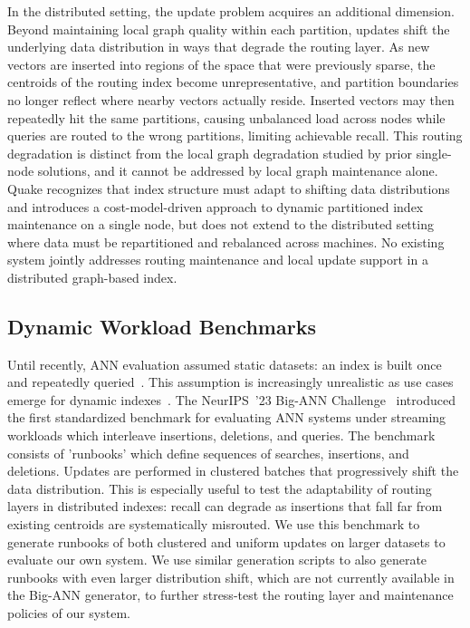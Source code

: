 \documentclass[sigconf,review,anonymous]{acmart}
\begin{document}
    In the distributed setting, the update problem acquires an additional dimension. Beyond maintaining local graph quality within each partition, updates shift the underlying data distribution in ways that degrade the routing layer. As new vectors are inserted into regions of the space that were previously sparse, the centroids of the routing index become unrepresentative, and partition boundaries no longer reflect where nearby vectors actually reside. Inserted vectors may then repeatedly hit the same partitions, causing unbalanced load across nodes while queries are routed to the wrong partitions, limiting achievable recall. This routing degradation is distinct from the local graph degradation studied by prior single-node solutions, and it cannot be addressed by local graph maintenance alone. Quake \cite{mohoney2025quake} recognizes that index structure must adapt to shifting data distributions and introduces a cost-model-driven approach to dynamic partitioned index maintenance on a single node, but does not extend to the distributed setting where data must be repartitioned and rebalanced across machines. No existing system jointly addresses routing maintenance and local update support in a distributed graph-based index.

\subsection{Dynamic Workload Benchmarks}
\label{sec:benchmarks}
    Until recently, ANN evaluation assumed static datasets: an index is built once and repeatedly queried~\cite{simhadri2022results,simhadri2024results,jegou2011searching,yandex2016deep}. This assumption is increasingly unrealistic as use cases emerge for dynamic indexes~\cite{singh2021freshdiskann, xu2023spfresh, mohoney2025quake, manu2022}. The NeurIPS~'23 Big-ANN Challenge~\cite{simhadri2024results} introduced the first standardized benchmark for evaluating ANN systems under streaming workloads which interleave insertions, deletions, and queries. The benchmark consists of 'runbooks' which define sequences of searches, insertions, and deletions. Updates are performed in clustered batches that progressively shift the data distribution. This is especially useful to test the adaptability of routing layers in distributed indexes: recall can degrade as insertions that fall far from existing centroids are systematically misrouted. We use this benchmark to generate runbooks of both clustered and uniform updates on larger datasets to evaluate our own system. We use similar generation scripts to also generate runbooks with even larger distribution shift, which are not currently available in the Big-ANN generator, to further stress-test the routing layer and maintenance policies of our system.
\end{document}
